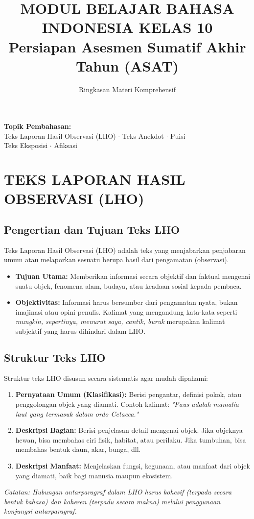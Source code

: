 \documentclass[12pt, a4paper]{article}
\title{MODUL BELAJAR BAHASA INDONESIA KELAS 10\\ \large Persiapan Asesmen Sumatif Akhir Tahun (ASAT)}
\author{Ringkasan Materi Komprehensif}
\date{}
\begin{document}
\maketitle

\begin{center}
    \textbf{Topik Pembahasan:} \\
    Teks Laporan Hasil Observasi (LHO) $\cdot$ Teks Anekdot $\cdot$ Puisi \\
    Teks Eksposisi $\cdot$ Afiksasi
\end{center}

\tableofcontents
\newpage

\section{TEKS LAPORAN HASIL OBSERVASI (LHO)}

\subsection{Pengertian dan Tujuan Teks LHO}
Teks Laporan Hasil Observasi (LHO) adalah teks yang menjabarkan penjabaran umum atau melaporkan sesuatu berupa hasil dari pengamatan (observasi).
\begin{itemize}
    \item \textbf{Tujuan Utama:} Memberikan informasi secara objektif dan faktual mengenai suatu objek, fenomena alam, budaya, atau keadaan sosial kepada pembaca.
    \item \textbf{Objektivitas:} Informasi harus bersumber dari pengamatan nyata, bukan imajinasi atau opini penulis. Kalimat yang mengandung kata-kata seperti \textit{mungkin, sepertinya, menurut saya, cantik, buruk} merupakan kalimat subjektif yang harus dihindari dalam LHO.
\end{itemize}

\subsection{Struktur Teks LHO}
Struktur teks LHO disusun secara sistematis agar mudah dipahami:
\begin{enumerate}
    \item \textbf{Pernyataan Umum (Klasifikasi):} Berisi pengantar, definisi pokok, atau penggolongan objek yang diamati. Contoh kalimat: \textit{"Paus adalah mamalia laut yang termasuk dalam ordo Cetacea."}
    \item \textbf{Deskripsi Bagian:} Berisi penjelasan detail mengenai objek. Jika objeknya hewan, bisa membahas ciri fisik, habitat, atau perilaku. Jika tumbuhan, bisa membahas bentuk daun, akar, bunga, dll.
    \item \textbf{Deskripsi Manfaat:} Menjelaskan fungsi, kegunaan, atau manfaat dari objek yang diamati, baik bagi manusia maupun ekosistem.
\end{enumerate}
\textit{Catatan: Hubungan antarparagraf dalam LHO harus kohesif (terpadu secara bentuk bahasa) dan koheren (terpadu secara makna) melalui penggunaan konjungsi antarparagraf.}
\end{document}
